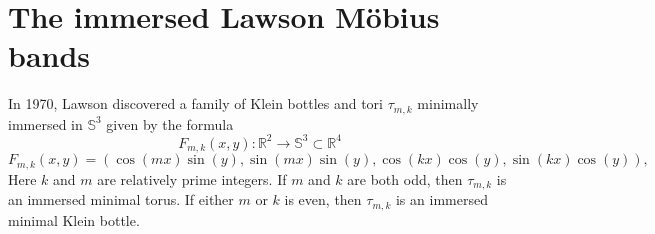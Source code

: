 \documentclass[11pt, reqno]{amsart}
\numberwithin{equation}{section}
\begin{document}
\section{The immersed Lawson M\"obius bands}\label{immersecsection}
In 1970, Lawson discovered a family of Klein bottles and tori $\tau_{m,k}$ minimally immersed in $\mathbb{S}^3$ given by the formula
\begin{equation}
F_{m,k}(x,y):\mathbb{R}^2\to\mathbb{S}^3\subset\mathbb{R}^4
\end{equation}
\begin{equation}\label{signs}
F_{m,k}(x,y) = (\cos(m x)\sin(y),\sin(m x)\sin(y),\cos(kx)\cos(y), \sin(kx)\cos(y)),
\end{equation}
Here $k$ and $m$ are relatively prime integers.  If $m$ and $k$ are both odd, then $\tau_{m,k}$ is an immersed minimal torus.  If either $m$ or $k$ is even, then $\tau_{m,k}$ is an immersed minimal Klein bottle.  
\end{document}
